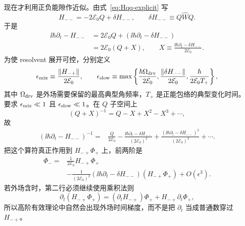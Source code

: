 现在才利用正负能隙作近似。由式~\cref{eq:Hqq-explicit} 写
\begin{equation}
H_{--}=-2\mathcal E_0Q+\delta H_{--},
\qquad
\delta H_{--}\equiv Q\widehat WQ.
\end{equation}
于是
\begin{align}
\ii\hbar\partial_t-H_{--}
&=2\mathcal E_0Q+
\left(\ii\hbar\partial_t-\delta H_{--}\right)\\
&=2\mathcal E_0(Q+X),
\qquad
X\equiv
\frac{\ii\hbar\partial_t-\delta H_{--}}{2\mathcal E_0}.
\label{eq:Feshbach-X-def}
\end{align}
为使 resolvent 展开可控，分别定义
\begin{equation}
 \epsilon_{\rm mix}\equiv
 \frac{\|H_{-+}\|}{2\mathcal E_0},
 \qquad
 \epsilon_{\rm slow}\equiv
 \max\left\{
 \frac{\hbar\Omega_{\rm drv}}{2\mathcal E_0},
 \frac{\|\delta H_{--}\|}{2\mathcal E_0},
 \frac{\hbar}{2\mathcal E_0T_+}
 \right\},
 \label{eq:Feshbach-smallparameters}
\end{equation}
其中 $\Omega_{\rm drv}$ 是外场需要保留的最高典型角频率，$T_+$ 是正能包络的典型变化时间。要求
$\epsilon_{\rm mix}\ll1$ 且 $\epsilon_{\rm slow}\ll1$。在 $Q$ 子空间上
\begin{equation}
(Q+X)^{-1}=Q-X+X^2-X^3+\cdots,
\end{equation}
故
\begin{align}
\left(\ii\hbar\partial_t-H_{--}\right)^{-1}
={}&\frac{Q}{2\mathcal E_0}
-\frac{\ii\hbar\partial_t-\delta H_{--}}{(2\mathcal E_0)^2}
+\frac{(\ii\hbar\partial_t-\delta H_{--})^2}{(2\mathcal E_0)^3}
+\cdots .
\label{eq:Feshbach-resolvent-series}
\end{align}
把这个算符真正作用到 $H_{-+}\Phi_+$ 上，前两阶是
\begin{align}
\Phi_-
={}&\frac{1}{2\mathcal E_0}H_{-+}\Phi_+\\
&-\frac{1}{(2\mathcal E_0)^2}
\left(\ii\hbar\partial_t-\delta H_{--}\right)
\left(H_{-+}\Phi_+\right)
+O(\epsilon^3).
\label{eq:Feshbach-negative-next}
\end{align}
若外场含时，第二行必须继续使用乘积法则
\begin{equation}
\partial_t(H_{-+}\Phi_+)
=(\partial_tH_{-+})\Phi_+ +H_{-+}\partial_t\Phi_+,
\label{eq:Feshbach-product-rule}
\end{equation}
所以高阶有效理论中自然会出现外场时间梯度，而不是把 $\partial_t$ 当成普通数穿过 $H_{-+}$。

